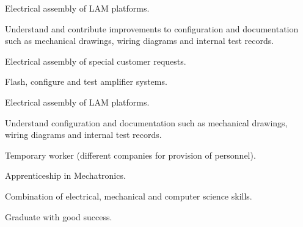 \documentclass[]{resume}
\begin{document}
\begin{minipage}[t]{0.66\textwidth}
	\begin{tightemize}

	\item Electrical assembly of LAM platforms.
	\item Understand and contribute improvements to configuration and documentation such as mechanical drawings, wiring diagrams and internal test records.
	\item Electrical assembly of special customer requests.
	\item Flash, configure and test amplifier systems.

	\end{tightemize}
	\sectionsep
\begin{tightemize}

	\item Electrical assembly of LAM platforms.
	\item Understand configuration and documentation such as mechanical drawings, wiring diagrams and internal test records.
	\item Temporary worker (different companies for provision of personnel).

\end{tightemize}
\sectionsep
\begin{tightemize}

\item Apprenticeship in Mechatronics.
\item Combination of electrical, mechanical and computer science skills.
\item Graduate with good success.


\end{tightemize}
\end{minipage}
\end{document}
